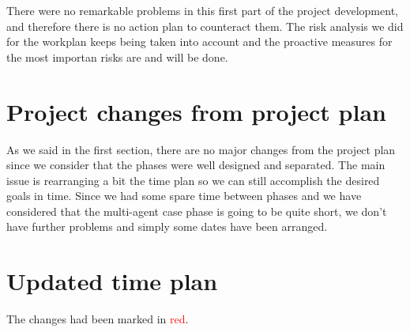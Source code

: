 \documentclass{article}
\begin{document}
There were no remarkable problems in this first part of the project development, and therefore there is no action plan to counteract them. The risk analysis we did for the workplan keeps being taken into account and the proactive measures for the most importan risks are and will be done.

\section{Project changes from project plan}
As we said in the first section, there are no major changes from the project plan since we consider that the phases were well designed and separated. The main issue is rearranging a bit the time plan so we can still accomplish the desired goals in time. Since we had some spare time between phases and we have considered that the multi-agent case phase is going to be quite short, we don't have further problems and simply some dates have been arranged.

\newpage
\appendix
\section{Updated time plan}

The changes had been marked in \textcolor{red}{red}. \\
\end{document}
